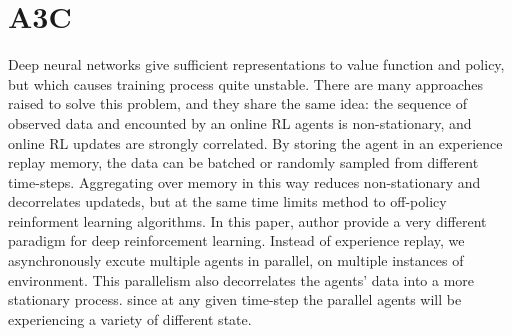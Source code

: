 \documentclass[11pt,a4paper]{article}
\begin{document}
\section{A3C}
Deep neural networks give sufficient representations to value function and policy, but which causes training process quite
unstable. There are many approaches raised to solve this problem, and they share the same idea: the sequence of observed 
data and encounted by an online RL agents is non-stationary, and online RL updates are strongly correlated. By storing the 
agent in an experience replay memory, the data can be batched or randomly sampled from different time-steps. Aggregating over memory in this way reduces non-stationary and decorrelates updateds, but at the same time limits method to off-policy reinforment learning algorithms. In this paper, author provide a very different paradigm for deep reinforcement learning. Instead of experience replay, we asynchronously excute multiple agents in parallel, on multiple instances of environment. This parallelism also decorrelates the agents' data into a more stationary process. since at any given time-step the parallel agents will be experiencing a variety of different state.
\end{document}
